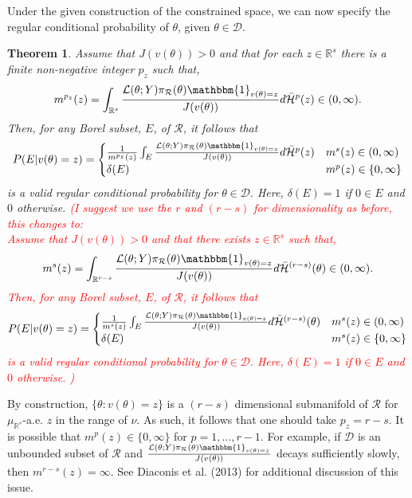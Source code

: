 \documentclass[12 point]{article}
\newtheorem{theorem_rcp}{Theorem}
\newcommand{\leo}[1]{\textcolor{red}{ (#1)}}
\begin{document}
Under the given construction of the constrained space, we can now specify the regular conditional probability of $\theta$, given $\theta \in \mathcal{D}.$
\begin{theorem_rcp}
\label{THM:RCP_construction}
Assume that $J(v(\theta)) > 0$ and that for each $z\in\mathbb{R}^s$ there is a finite non-negative integer $p_z$ such that,  $$m^{p_z}(z) = \int_{\mathbb{R}^ {s}} \frac{\mathcal{L}(\theta; Y) \pi_\mathcal{R}(\theta) \mathbbm{1}_{v(\theta)=z}}{J(v(\theta))} d\bar{\mathcal{H}}^{p}(z) \in (0,\infty).$$
Then, for any Borel subset, $E$, of $\mathcal{R}$, it follows that 
$$P(E|v(\theta) = z) = 
\begin{cases}
\frac{1}{m^{p_z}(z)} \int_E \frac{\mathcal{L}(\theta; Y) \pi_\mathcal{R}(\theta) \mathbbm{1}_{v(\theta)=z}}{J(v(\theta))} d\bar{\mathcal{H}}^{p}(z)  & m^s(z)\in (0,\infty)  \\
\delta (E) & m^p(z) \in \{0,\infty\}
\end{cases}$$
is a valid regular conditional probability for $\theta\in\mathcal{D}.$ Here, $\delta (E)=1$ if $0\in E$ and $0$ otherwise. 
\leo{I suggest we use the $r$ and $(r-s)$ for dimensionality as before,
this changes to:\\
Assume that $J(v(\theta)) > 0$ and that there exists $z\in\mathbb{R}^s$  such that,  $$m^{s}(z) = \int_{\mathbb{R}^ {r-s}} \frac{\mathcal{L}(\theta; Y) \pi_\mathcal{R}(\theta) \mathbbm{1}_{v(\theta)=z}}{J(v(\theta))} d\bar{\mathcal{H}}^{(r-s)}(\theta) \in (0,\infty).$$
Then, for any Borel subset, $E$, of $\mathcal{R}$, it follows that 
$$P(E|v(\theta) = z) = 
\begin{cases}
\frac{1}{m^{s}(z)} \int_E \frac{\mathcal{L}(\theta; Y) \pi_\mathcal{R}(\theta) \mathbbm{1}_{v(\theta)=z}}{J(v(\theta))} d\bar{\mathcal{H}}^{(r-s)}(\theta)  & m^s(z)\in (0,\infty)  \\
\delta (E) & m^s(z) \in \{0,\infty\}
\end{cases}$$
is a valid regular conditional probability for $\theta\in\mathcal{D}.$ Here, $\delta (E)=1$ if $0\in E$ and $0$ otherwise. 
}
\end{theorem_rcp}




By construction, $\{\theta:v(\theta)=z\}$ is a $(r-s)$ dimensional submanifold of $\mathcal{R}$ for $\mu_{\mathbb{R}^s}$-a.e. $z$ in the range of $\nu$. As such, it follows that one should take $p_z=r-s$.  %
It is possible that $m^p(z)\in\{0,\infty\}$ for $p=1,\dots,r-1$.  For example, if $\mathcal{D}$ is an unbounded subset of $\mathcal{R}$ and $\frac{\mathcal{L}(\theta; Y) \pi_\mathcal{R}(\theta) \mathbbm{1}_{v(\theta)=z}}{J(v(\theta))}$ decays sufficiently slowly, then $m^{r-s}(z)=\infty.$ See Diaconis et al. (2013) for additional discussion of this issue. 
\end{document}

